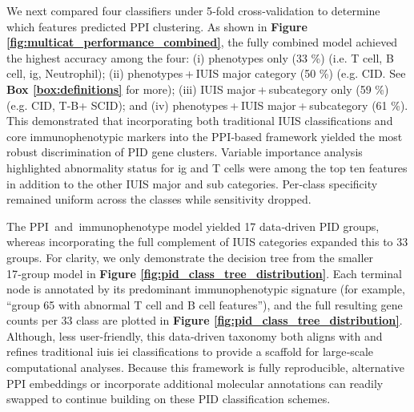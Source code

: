 We next compared four classifiers under 5‑fold cross‑validation to determine which features predicted PPI clustering.
As shown in \textbf{Figure \ref{fig:multicat_performance_combined}}, the fully combined model achieved the highest accuracy among the four:
(i) phenotypes only (33 \%) (i.e. T cell, B cell, \ac{ig}, Neutrophil);
(ii) phenotypes + IUIS major category (50 \%) (e.g. CID. See \textbf{Box \ref{box:definitions}} for more);
(iii) IUIS major + subcategory only (59 \%) (e.g. CID, T-B+ SCID); and
(iv) phenotypes + IUIS major + subcategory  (61 \%).
This demonstrated that incorporating both traditional IUIS classifications and core immunophenotypic markers into the PPI‑based framework yielded the most robust discrimination of PID gene clusters.
Variable importance analysis highlighted abnormality status for \ac{ig} and T cells
were among the top ten features in addition to the other IUIS major and sub categories. 
Per‑class specificity remained uniform across the classes while sensitivity dropped.

The PPI  and  immunophenotype model yielded 17 data‑driven PID groups, whereas incorporating the full complement of IUIS categories expanded this to 33 groups. 
For clarity, we only demonstrate the decision tree from the smaller 17‑group model in 
\textbf{Figure \ref{fig:pid_class_tree_distribution}}.
Each terminal node is annotated by its predominant immunophenotypic signature (for example, ``group 65 with abnormal T cell and B cell features''), and the full resulting gene counts per 33 class are plotted in 
\textbf{Figure \ref{fig:pid_class_tree_distribution}}.
Although, less user-friendly, this data‑driven taxonomy 
both aligns with and refines traditional \ac{iuis} \ac{iei} classifications
to provide a scaffold for large‑scale computational analyses.
Because this framework is fully reproducible, alternative PPI embeddings or incorporate additional molecular annotations can readily swapped to continue building on these PID classification schemes.

